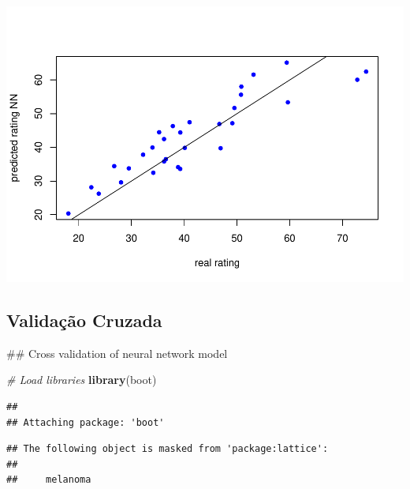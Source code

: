 \documentclass[a4paper, 12pt]{article}
\newenvironment{Shaded}{\begin{snugshade}}{\end{snugshade}}
\newcommand{\KeywordTok}[1]{\textcolor[rgb]{0.13,0.29,0.53}{\textbf{#1}}}
\newcommand{\DecValTok}[1]{\textcolor[rgb]{0.00,0.00,0.81}{#1}}
\newcommand{\FloatTok}[1]{\textcolor[rgb]{0.00,0.00,0.81}{#1}}
\newcommand{\StringTok}[1]{\textcolor[rgb]{0.31,0.60,0.02}{#1}}
\newcommand{\CommentTok}[1]{\textcolor[rgb]{0.56,0.35,0.01}{\textit{#1}}}
\newcommand{\OperatorTok}[1]{\textcolor[rgb]{0.81,0.36,0.00}{\textbf{#1}}}
\newcommand{\NormalTok}[1]{#1}
\begin{document}
\includegraphics{Artigo_files/figure-latex/unnamed-chunk-4-1.pdf}

\begin{Shaded}
\end{Shaded}

\subsection{Validação Cruzada}\label{validacao-cruzada}

\begin{Shaded}
\begin{Highlighting}[]
\NormalTok{## Cross validation of neural network model}

\CommentTok{# Load libraries}
\KeywordTok{library}\NormalTok{(boot)}
\end{Highlighting}
\end{Shaded}

\begin{verbatim}
## 
## Attaching package: 'boot'
\end{verbatim}

\begin{verbatim}
## The following object is masked from 'package:lattice':
## 
##     melanoma
\end{verbatim}
\end{document}
